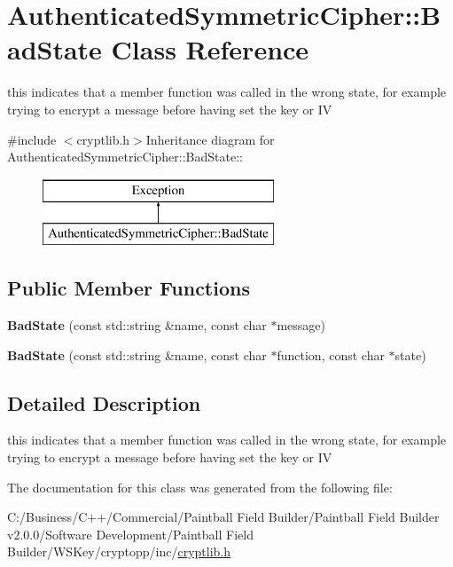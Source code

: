 \hypertarget{class_authenticated_symmetric_cipher_1_1_bad_state}{
\section{AuthenticatedSymmetricCipher::BadState Class Reference}
\label{class_authenticated_symmetric_cipher_1_1_bad_state}
}


this indicates that a member function was called in the wrong state, for example trying to encrypt a message before having set the key or IV  


{\ttfamily \#include $<$cryptlib.h$>$}Inheritance diagram for AuthenticatedSymmetricCipher::BadState::\begin{figure}[H]
\begin{center}
\leavevmode
\includegraphics[height=2cm]{class_authenticated_symmetric_cipher_1_1_bad_state}
\end{center}
\end{figure}
\subsection*{Public Member Functions}
\begin{DoxyCompactItemize}
\item 
\hypertarget{class_authenticated_symmetric_cipher_1_1_bad_state_ad5ffe67707bcbce8d3f3730a78e55691}{
{\bfseries BadState} (const std::string \&name, const char $\ast$message)}
\label{class_authenticated_symmetric_cipher_1_1_bad_state_ad5ffe67707bcbce8d3f3730a78e55691}

\item 
\hypertarget{class_authenticated_symmetric_cipher_1_1_bad_state_a97539823cfee855c8119c2b1ba66fb5f}{
{\bfseries BadState} (const std::string \&name, const char $\ast$function, const char $\ast$state)}
\label{class_authenticated_symmetric_cipher_1_1_bad_state_a97539823cfee855c8119c2b1ba66fb5f}

\end{DoxyCompactItemize}


\subsection{Detailed Description}
this indicates that a member function was called in the wrong state, for example trying to encrypt a message before having set the key or IV 

The documentation for this class was generated from the following file:\begin{DoxyCompactItemize}
\item 
C:/Business/C++/Commercial/Paintball Field Builder/Paintball Field Builder v2.0.0/Software Development/Paintball Field Builder/WSKey/cryptopp/inc/\hyperlink{cryptlib_8h}{cryptlib.h}\end{DoxyCompactItemize}
